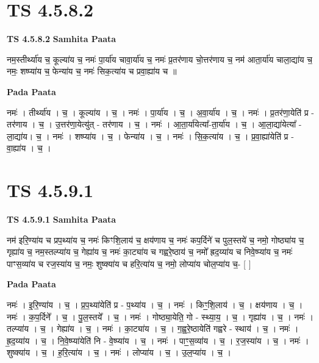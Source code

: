 \documentclass[17pt]{extarticle}
\begin{document}

\section{ TS 4.5.8.2 }

\textbf{TS 4.5.8.2 } \newline
\textbf{Samhita Paata} \newline

नम॒स्तीर्थ्या॑य च॒ कूल्या॑य च॒ नमः॑ पा॒र्या॑य चावा॒र्या॑य च॒ नमः॑ प्र॒तर॑णाय चो॒त्तर॑णाय च॒ नम॑ आता॒र्या॑य चाला॒द्या॑य च॒ नमः॒ शष्प्या॑य च॒ फेन्या॑य च॒ नमः॑ सिक॒त्या॑य च प्रवा॒ह्या॑य च ॥ \newline

\textbf{Pada Paata} \newline

नमः॑ । तीर्थ्या॑य । च॒ । कूल्या॑य । च॒ । नमः॑ । पा॒र्या॑य । च॒ । अ॒वा॒र्या॑य । च॒ । नमः॑ । प्र॒तर॑णा॒येति॑ प्र - तर॑णाय । च॒ । उ॒त्तर॑णा॒येत्यु॑त् - तर॑णाय । च॒ । नमः॑ । आ॒ता॒र्या॑येत्या᳚-ता॒र्या॑य । च॒ । आ॒ला॒द्या॑येत्या᳚ - ला॒द्या॑य। च॒ । नमः॑ । शष्प्या॑य । च॒ । फेन्या॑य । च॒ । नमः॑ । सि॒क॒त्या॑य । च॒ । प्र॒वा॒ह्या॑येति॑ प्र - वा॒ह्या॑य । च॒ ।  \newline





\section{ TS 4.5.9.1 }

\textbf{TS 4.5.9.1 } \newline
\textbf{Samhita Paata} \newline

नम॑ इरि॒ण्या॑य च प्रप॒थ्या॑य च॒ नमः॑ किꣳशि॒लाय॑ च॒ क्षय॑णाय च॒ नमः॑ कप॒र्दिने॑ च पुल॒स्तये॑ च॒ नमो॒ गोष्ठ्या॑य च॒ गृह्या॑य च॒ नम॒स्तल्प्या॑य च॒ गेह्या॑य च॒ नमः॑ का॒ट्या॑य च गह्वरे॒ष्ठाय॑ च॒ नमो᳚ ह्रद॒य्या॑य च निवे॒ष्प्या॑य च॒ नमः॑ पाꣳस॒व्या॑य च रज॒स्या॑य च॒ नमः॒ शुष्क्या॑य च हरि॒त्या॑य च॒ नमो॒ लोप्या॑य चोल॒प्या॑य च॒- [  ] \newline

\textbf{Pada Paata} \newline

नमः॑ । इ॒रि॒ण्या॑य । च॒ । प्र॒प॒थ्या॑येति॑ प्र - प॒थ्या॑य । च॒ । नमः॑ । किꣳ॒॒शि॒लाय॑ । च॒ । क्षय॑णाय । च॒ । नमः॑ । क॒प॒र्दिने᳚ । च॒ । पु॒ल॒स्तये᳚ । च॒ । नमः॑ । गोष्ठ्या॒येति॒ गो - स्थ्या॒य॒ । च॒ । गृह्या॑य । च॒ । नमः॑ । तल्प्या॑य । च॒ । गेह्या॑य । च॒ । नमः॑ । का॒ट्या॑य । च॒ । ग॒ह्व॒रे॒ष्ठायेति॑ गह्वरे - स्थाय॑ । च॒ । नमः॑ । ह्र॒द॒य्या॑य । च॒ । नि॒वे॒ष्प्या॑येति॑ नि - वे॒ष्प्या॑य । च॒ । नमः॑ । पाꣳ॒॒स॒व्या॑य । च॒ । र॒ज॒स्या॑य । च॒ । नमः॑ । शुष्क्या॑य । च॒ । ह॒रि॒त्या॑य । च॒ । नमः॑ । लोप्या॑य । च॒ । उ॒ल॒प्या॑य । च॒ ।  \newline
\end{document}
